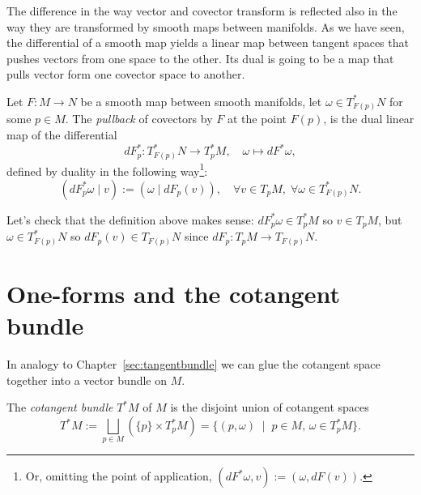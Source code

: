 The difference in the way vector and covector transform is reflected also in the way they are transformed by smooth maps between manifolds.
As we have seen, the differential of a smooth map yields a linear map between tangent spaces that pushes vectors from one space to the other.
Its dual is going to be a map that pulls vector form one covector space to another.

\begin{definition}\label{def:pullback:oneform}
  Let $F:M\to N$ be a smooth map between smooth manifolds, let $\omega\in T^*_{F(p)}N$ for some $p\in M$.
  The \emph{pullback} of covectors by $F$ at the point $F(p)$, is the dual linear map of the differential
  \begin{equation}
    dF^*_p : T^*_{F(p)} N \to T^*_p M, \quad \omega \mapsto dF^*\omega,
  \end{equation}
  defined by duality in the following way\footnote{Or, omitting the point of application, $\left(dF^*\omega, v\right) := \left(\omega, dF(v)\right)$.}:
  \begin{equation}
    \left(dF^*_p\omega \mid v\right) := \left(\omega \mid dF_p(v)\right),\quad
    \forall v\in T_pM,\; \forall \omega\in T^*_{F(p)}N.
  \end{equation}
\end{definition}
\noindent Let's check that the definition above makes sense: $dF^*_p \omega \in T^*_p M$ so $v\in T_p M$, but $\omega\in T^*_{F(p)}N$ so $dF_p(v)\in T_{F(p)}N$ since $dF_p: T_pM\to T_{F(p)}N$.

\section{One-forms and the cotangent bundle}

In analogy to Chapter~\ref{sec:tangentbundle} we can glue the cotangent space together into a vector bundle on $M$.

\begin{definition}
  The \emph{cotangent bundle} $T^*M$ of $M$ is the disjoint union of cotangent spaces
  \begin{equation}
    T^*M := \bigsqcup_{p\in M}\left(\{p\}\times T^*_pM\right)
       = \{(p,\omega) \;\mid\; p\in M,\, \omega\in T^*_pM\}.
  \end{equation}
\end{definition}

